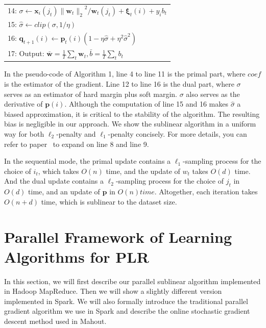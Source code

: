 \documentclass{llncs}
\newcommand{\bw}{\mathbf{w}}
\newcommand{\bp}{\mathbf{p}}
\newcommand{\bq}{\mathbf{q}}
\newcommand{\bxi}{\mathbf{\xi}}
\newcommand{\lc}{\left(}
\newcommand{\rc}{\right)}
\newcommand{\li}{\lc i\rc}
\newcommand{\tspace}{\hspace*{2em}}
\newcommand{\tspaces}{\hspace*{1.5em}}
\begin{document}
\begin{table} [ht]
\begin{tabular}{l}
	14:	\tspaces\tspace $\sigma \leftarrow \mathbf{x}_{i} \lc {j}_{t}\rc{\|{\bw}_{t}\|_2}^{2}/{\bw}_{t}\lc {j}_{t} \rc+{\bxi}_{t}\li+{y}_{i}{b}_{t}$ \\
	15:	\tspaces\tspace $\hat{\sigma} \leftarrow clip\lc \sigma,1/\eta \rc$ \\
	16:	\tspaces\tspace ${\bq}_{t+1}\li \leftarrow {\bp}_{t}\li\lc 1-\eta\hat{\sigma} + {\eta}^{2}{\hat{\sigma}}^{2} \rc$ \\
	17:	Output: $\bar{\bw}=\frac{1}{T}\sum_{t}{\bw}_{t},\bar{b}=\frac{1}{T}\sum_{t}{b}_{t}$ \\
	\hline
	\end{tabular} 	
	\label{alg:1}
	\end{table}

In the pseudo-code of Algorithm 1, line 4 to line 11 is the primal part, where $coef$ is the estimator of the gradient.
Line 12 to line 16 is the dual part, where $\sigma$ serves as an estimator of hard margin plus soft margin.
$\sigma$ also serves as the derivative of $\bp(i)$.
Although the computation of line 15 and 16 makes $\hat{\sigma}$ a biased approximation, it is critical to the stability of the algorithm. The resulting bias is negligible in our approach.
We show the sublinear algorithm in a uniform way for both $\ell_2$-penalty and $\ell_1$-penalty concisely.
For more details, you can refer to paper~\cite{peng2012sublinear} to expand on line 8 and line 9.

In the sequential mode, the primal update contains a $\ell_1$-sampling process for the choice of $i_t$, which takes $O(n)$ time, and the update of $w_t$ takes $O(d)$ time.
And the dual update contains a $\ell_2$-sampling process for the choice of $j_t$ in $O(d)$ time, and an update of $\bp$ in $O(n) time$.
Altogether, each iteration takes $O(n+d)$ time, which is sublinear to the dataset size.

\section{Parallel Framework of Learning Algorithms for PLR} \label{sec:framework}
In this section, we will first describe our parallel sublinear algorithm implemented in Hadoop MapReduce.
Then we will show a slightly different version implemented in Spark.
We will also formally introduce the traditional parallel gradient algorithm we use in Spark and describe the online stochastic gradient descent method used in Mahout.
\end{document}
